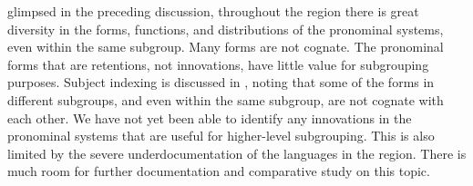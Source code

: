  glimpsed in the preceding discussion,
throughout the region there is great diversity in the forms,
functions, and distributions of the pronominal systems,
even within the same subgroup.
Many forms are not cognate.
The pronominal forms that are retentions,
not innovations, have little value for subgrouping purposes.
Subject indexing is discussed in ,
noting that some of the forms in different subgroups,
and even within the same subgroup,
are not cognate with each other.
We have not yet been able to identify any innovations in the
pronominal systems that are useful for higher-level subgrouping.
This is also limited by the severe underdocumentation of the
languages in the region.
There is much room for further documentation
and comparative study on this topic.
